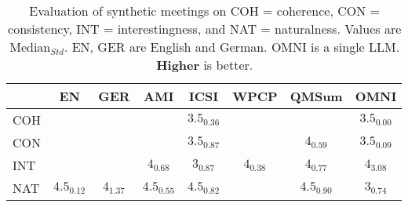 \begin{table}[t]
    \centering
    \renewcommand{\arraystretch}{1.2} %
    \scriptsize
    \setlength{\tabcolsep}{3.8pt} %


    \begin{tabular}{lccccccc}
        \toprule
        \rowcolor{gray!20} %
         & \textbf{EN} & \textbf{GER} & \textbf{AMI} & \textbf{ICSI} & \textbf{WPCP} & \textbf{QMSum} & \textbf{OMNI}\\
        \midrule
        COH 
            & \cellcolor{highlightGreen}{$\textbf{4.5}_{\textit{0.00}}$}
            & \cellcolor{highlightGreen}{$\textbf{4.5}_{\textit{0.18}}$}
            & \cellcolor{highlightGreen}{$\textbf{4.5}_{\textit{0.36}}$}
            & $3.5_{\textit{0.36}}$
            & \cellcolor{highlightGreen}{$\textbf{4.5}_{\textit{0.00}}$}
            & \cellcolor{highlightGreen}{$\textbf{4.5}_{\textit{0.73}}$}
            & $3.5_{\textit{0.00}}$\\[1ex]
        CON 
            & \cellcolor{highlightGreen}{$\textbf{4.5}_{\textit{0.07}}$}
            & \cellcolor{highlightGreen}{$\textbf{4.5}_{\textit{0.09}}$}
            & \cellcolor{highlightGreen}{$\textbf{4.5}_{\textit{0.68}}$}
            & $3.5_{\textit{0.87}}$
            & \cellcolor{highlightGreen}{$\textbf{4.5}_{\textit{0.38}}$}
            & $4_{\textit{0.59}}$
            & $3.5_{\textit{0.09}}$\\[1ex]
        INT 
            & \cellcolor{highlightGreen}{$\textbf{4.5}_{\textit{0.13}}$}
            & \cellcolor{highlightGreen}{$\textbf{4.5}_{\textit{0.23}}$}
            & $4_{\textit{0.68}}$
            & $3_{\textit{0.87}}$
            & $4_{\textit{0.38}}$
            & $4_{\textit{0.77}}$
            & $4_{\textit{3.08}}$\\[1ex]
        NAT 
            & $4.5_{\textit{0.12}}$
            & $4_{\textit{1.37}}$
            & $4.5_{\textit{0.55}}$
            & $4.5_{\textit{0.82}}$
            & \cellcolor{highlightGreen}{$\textbf{5}_{\textit{0.00}}$}
            & $4.5_{\textit{0.90}}$
            & $3_{\textit{0.74}}$\\
        \bottomrule
    \end{tabular}
    \caption{Evaluation of synthetic meetings on COH = coherence, CON = consistency, INT = interestingness, and NAT = naturalness. Values are Median$_{Std}$. EN, GER are \dataset{} English and German. OMNI is a single LLM. \textbf{Higher} is better.}
    \label{tab:common_dimensions_evaluation}
\end{table}



